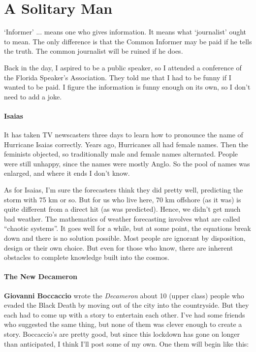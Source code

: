 \section{A Solitary Man}

\begin{quotex}
`Informer' ... means one who gives information. It means what `journalist' ought to mean. The only difference is that the Common Informer may be paid if he tells the truth. The common journalist will be ruined if he does.
\end{quotex}


Back in the day, I aspired to be a public speaker, so I attended a conference of the Florida Speaker's Association. They told me that I had to be funny if I wanted to be paid. I figure the information is funny enough on its own, so I don't need to add a joke.

\paragraph{Isaias}


It has taken TV newscasters three days to learn how to pronounce the name of Hurricane Isaias correctly. Years ago, Hurricanes all had female names. Then the feminists objected, so traditionally male and female names alternated. People were still unhappy, since the names were mostly Anglo. So the pool of names was enlarged, and where it ends I don't know.

As for Isaias, I'm sure the forecasters think they did pretty well, predicting the storm with 75 km or so. But for us who live here, 70 km offshore (as it was) is quite different from a direct hit (as was predicted). Hence, we didn't get much bad weather. The mathematics of weather forecasting involves what are called ``chaotic systems''. It goes well for a while, but at some point, the equations break down and there is no solution possible. Most people are ignorant by disposition, design or their own choice. But even for those who know, there are inherent obstacles to complete knowledge built into the cosmos.

\paragraph{The New Decameron}


\textbf{Giovanni Boccaccio} wrote the \emph{Decameron} about 10 (upper class) people who evaded the Black Death by moving out of the city into the countryside. But they each had to come up with a story to entertain each other. I've had some friends who suggested the same thing, but none of them was clever enough to create a story. Boccaccio's are pretty good, but since this lockdown has gone on longer than anticipated, I think I'll post some of my own. One them will begin like this:

